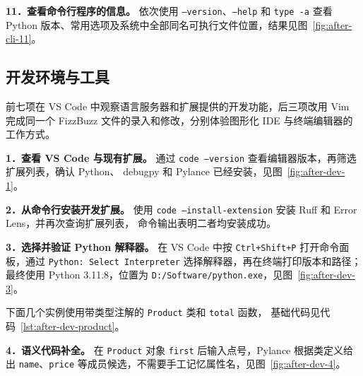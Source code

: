 \documentclass[12pt,a4paper,fontset=fandol]{ctexart}
\begin{document}
\noindent\textbf{11．查看命令行程序的信息。}
依次使用 \texttt{--version}、\texttt{--help} 和 \texttt{type -a} 查看 Python
版本、常用选项及系统中全部同名可执行文件位置，结果见图~\ref{fig:after-cli-11}。

\FloatBarrier

\subsection{开发环境与工具}

前七项在 VS Code 中观察语言服务器和扩展提供的开发功能，后三项改用 Vim
完成同一个 FizzBuzz 文件的录入和修改，分别体验图形化 IDE 与终端编辑器的工作方式。

\noindent\textbf{1．查看 VS Code 与现有扩展。}
通过 \texttt{code --version} 查看编辑器版本，再筛选扩展列表，确认 Python、
debugpy 和 Pylance 已经安装，见图~\ref{fig:after-dev-1}。

\noindent\textbf{2．从命令行安装开发扩展。}
使用 \texttt{code --install-extension} 安装 Ruff 和 Error Lens，并再次查询扩展列表，
命令输出表明二者均安装成功。

\noindent\textbf{3．选择并验证 Python 解释器。}
在 VS Code 中按 \texttt{Ctrl+Shift+P} 打开命令面板，通过
\texttt{Python: Select Interpreter} 选择解释器，再在终端打印版本和路径；
最终使用 Python 3.11.8，位置为 \texttt{D:/Software/python.exe}，见图~\ref{fig:after-dev-3}。

下面几个实例使用带类型注解的 \texttt{Product} 类和 \texttt{total} 函数，
基础代码见代码~\ref{lst:after-dev-product}。



\noindent\textbf{4．语义代码补全。}
在 \texttt{Product} 对象 \texttt{first} 后输入点号，Pylance 根据类定义给出
\texttt{name}、\texttt{price} 等成员候选，不需要手工记忆属性名，见图~\ref{fig:after-dev-4}。
\end{document}
